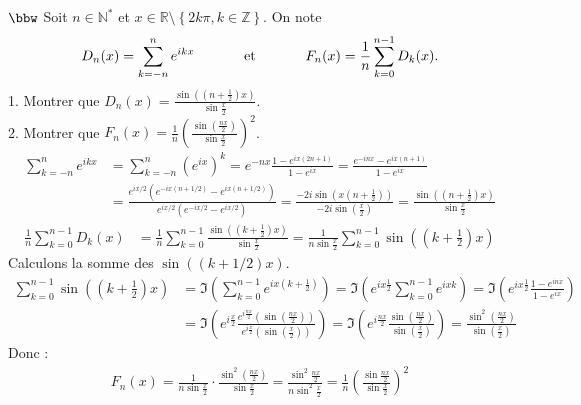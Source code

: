 \documentclass[11pt]{article}
\begin{document}
\begin{exercice}{$\bbw$}{}
    Soit $n\in\mathbb{N}^*$ et $x\in\mathbb{R} \setminus \left\{ 2k\pi, k\in\mathbb{Z} \right\}$. On note
    \begin{equation*}
        D_n(x) = \sum_{k=-n}^{n}{e^{ikx}} \hspace{1.25cm} \text{et} \hspace{1.25cm} F_n(x) = \frac{1}{n}\sum_{k=0}^{n-1}{D_k(x)}.
    \end{equation*}
    1. Montrer que $D_n(x)=\frac{\sin\left( (n+\frac{1}{2})x \right)}{\sin\frac{x}{2}}$.\\
    2. Montrer que $F_n(x)=\frac{1}{n}\left( \frac{\sin\left( \frac{nx}{2} \right)}{\sin\frac{x}{2}} \right)^2$.
    \tcblower
    \begin{align*}
        \sum_{k=-n}^{n}{e^{ikx}}&=\sum_{k=-n}^{n}{\left(e^{ix}\right)^k}=e^{-nx}\frac{1-e^{ix(2n+1)}}{1-e^{ix}}=\frac{e^{-inx}-e^{ix(n+1)}}{1-e^{ix}}\\
        &=\frac{e^{ix/2}(e^{-ix(n+1/2)}-e^{ix(n+1/2)})}{e^{ix/2}(e^{-ix/2}-e^{ix/2})}=\frac{-2i\sin(x(n+\frac{1}{2}))}{-2i\sin(\frac{x}{2})}=\frac{\sin((n+\frac{1}{2})x)}{\sin\frac{x}{2}}
    \end{align*}
    \begin{align*}
        \frac{1}{n}\sum_{k=0}^{n-1}{D_k(x)} &= \frac{1}{n}\sum_{k=0}^{n-1}{\frac{\sin((k+\frac{1}{2})x)}{\sin\frac{x}{2}}}=\frac{1}{n\sin\frac{x}{2}}\sum_{k=0}^{n-1}{\sin((k+\frac{1}{2})x)}
    \end{align*}
    Calculons la somme des $\sin((k+1/2)x)$.
    \begin{align*}
        \sum^{n-1}_{k=0}{\sin((k+\frac{1}{2})x)}&=\Im\left( \sum_{k=0}^{n-1}{e^{ix(k+\frac{1}{2})}} \right) = \Im\left( e^{ix\frac{1}{2}}\sum_{k=0}^{n-1}{e^{ixk}} \right) = \Im\left( e^{ix\frac{1}{2}}\frac{1-e^{inx}}{1-e^{ix}} \right)\\
        &= \Im\left( e^{i\frac{x}{2}}\frac{e^{i\frac{nx}{2}}(\sin(\frac{nx}{2}))}{e^{i\frac{x}{2}}(\sin(\frac{x}{2}))} \right) = \Im\left(e^{i\frac{nx}{2}}\frac{\sin(\frac{nx}{2})}{\sin(\frac{x}{2})}\right)=\frac{\sin^2(\frac{nx}{2})}{\sin(\frac{x}{2})}
    \end{align*}
    Donc :
    \begin{align*}
        F_n(x)=\frac{1}{n\sin\frac{x}{2}}\cdot\frac{\sin^2(\frac{nx}{2})}{\sin\frac{x}{2}}=\frac{\sin^2\frac{nx}{2}}{n\sin^2\frac{x}{2}}=\frac{1}{n}\left(\frac{\sin\frac{nx}{2}}{\sin\frac{x}{2}}\right)^2
    \end{align*}
\end{exercice}
\end{document}
